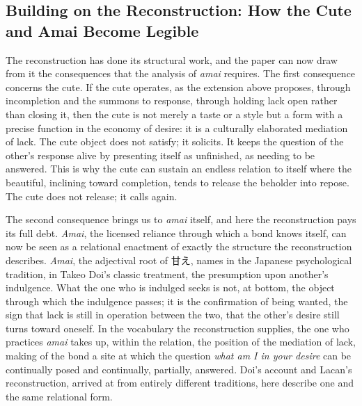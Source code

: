 \documentclass[11pt,a4paper]{article}
\newcommand{\cn}[1]{{\cjkfont #1}}
\begin{document}
\subsection{Building on the Reconstruction: How the Cute and Amai Become Legible}

The reconstruction has done its structural work, and the paper can now draw from it the consequences that the analysis of \textit{amai} requires. The first consequence concerns the cute. If the cute operates, as the extension above proposes, through incompletion and the summons to response, through holding lack open rather than closing it, then the cute is not merely a taste or a style but a form with a precise function in the economy of desire: it is a culturally elaborated mediation of lack. The cute object does not satisfy; it solicits. It keeps the question of the other's response alive by presenting itself as unfinished, as needing to be answered. This is why the cute can sustain an endless relation to itself where the beautiful, inclining toward completion, tends to release the beholder into repose. The cute does not release; it calls again.

The second consequence brings us to \textit{amai} itself, and here the reconstruction pays its full debt. \textit{Amai}, the licensed reliance through which a bond knows itself, can now be seen as a relational enactment of exactly the structure the reconstruction describes. \textit{Amai}, the adjectival root of \cn{甘え}, names in the Japanese psychological tradition, in Takeo Doi's classic treatment, the presumption upon another's indulgence. What the one who is indulged seeks is not, at bottom, the object through which the indulgence passes; it is the confirmation of being wanted, the sign that lack is still in operation between the two, that the other's desire still turns toward oneself. In the vocabulary the reconstruction supplies, the one who practices \textit{amai} takes up, within the relation, the position of the mediation of lack, making of the bond a site at which the question \textit{what am I in your desire} can be continually posed and continually, partially, answered. Doi's account and Lacan's reconstruction, arrived at from entirely different traditions, here describe one and the same relational form.
\end{document}
